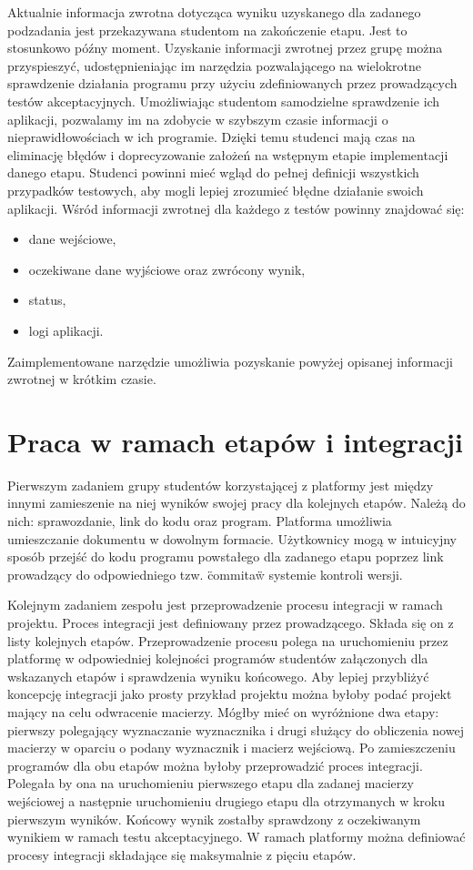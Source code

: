 Aktualnie informacja zwrotna dotycząca wyniku uzyskanego dla zadanego podzadania jest przekazywana studentom na zakończenie etapu.
Jest to stosunkowo późny moment.
Uzyskanie informacji zwrotnej przez grupę można przyspieszyć, udostępnieniając im narzędzia pozwalającego na wielokrotne sprawdzenie działania programu przy użyciu zdefiniowanych przez prowadzących testów akceptacyjnych.
Umożliwiając studentom samodzielne sprawdzenie ich aplikacji, pozwalamy im na zdobycie w szybszym czasie informacji o nieprawidłowościach w ich programie.
Dzięki temu studenci mają czas na eliminację błędów i doprecyzowanie założeń na wstępnym etapie implementacji danego etapu.
Studenci powinni mieć wgląd do pełnej definicji wszystkich przypadków testowych, aby mogli lepiej zrozumieć błędne działanie swoich aplikacji.
Wśród informacji zwrotnej dla każdego z testów powinny znajdować się:
\begin{itemize}
    \item dane wejściowe,
    \item oczekiwane dane wyjściowe oraz zwrócony wynik,
    \item status,
    \item logi aplikacji.
\end{itemize}

Zaimplementowane narzędzie umożliwia pozyskanie powyżej opisanej informacji zwrotnej w krótkim czasie.


\section{Praca w ramach etapów i integracji}

Pierwszym zadaniem grupy studentów korzystającej z platformy jest między innymi zamieszenie na niej wyników swojej pracy dla kolejnych etapów.
Należą do nich: sprawozdanie, link do kodu oraz program.
Platforma umożliwia umieszczanie dokumentu w dowolnym formacie.
Użytkownicy mogą w intuicyjny sposób przejść do kodu programu powstałego dla zadanego etapu poprzez link prowadzący do odpowiedniego tzw. \"commita\" w systemie kontroli wersji.

Kolejnym zadaniem zespołu jest przeprowadzenie procesu integracji w ramach projektu.
Proces integracji jest definiowany przez prowadzącego.
Składa się on z listy kolejnych etapów.
Przeprowadzenie procesu polega na uruchomieniu przez platformę w odpowiedniej kolejności programów studentów załączonych dla wskazanych etapów i sprawdzenia wyniku końcowego.
Aby lepiej przybliżyć koncepcję integracji jako prosty przykład projektu można byłoby podać projekt mający na celu odwracenie macierzy.
Mógłby mieć on wyróżnione dwa etapy: pierwszy polegający wyznaczanie wyznacznika i drugi służący do obliczenia nowej macierzy w oparciu o podany wyznacznik i macierz wejściową.
Po zamieszczeniu programów dla obu etapów można byłoby przeprowadzić proces integracji.
Polegała by ona na uruchomieniu pierwszego etapu dla zadanej macierzy wejściowej a następnie uruchomieniu drugiego etapu dla otrzymanych w kroku pierwszym wyników.
Końcowy wynik zostałby sprawdzony z oczekiwanym wynikiem w ramach testu akceptacyjnego.
W ramach platformy można definiować procesy integracji składające się maksymalnie z pięciu etapów.

